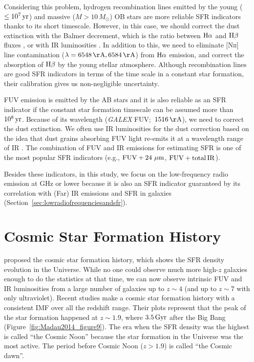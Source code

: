 Considering this problem, hydrogen recombination lines emitted by the young ($\leq 10^7\,\mathrm{yr}$) and massive ($M > 10\,M_{\odot}$) OB stars are more reliable SFR indicators thanks to its short timescale.
However, in this case, we should correct the dust extinction with the Balmer decrement, which is the ratio between $\mathrm{H\alpha}$ and $\mathrm{H\beta}$ fluxes \citep{Lequeux1981}, or with IR luminosities \citep{Kennicutt2009}.
In addition to this, we need to eliminate [N\textsc{ii}] line contamination ($\lambda = 6548\,\mr{\AA}, 6584\,\mr{\AA}$) from $\mathrm{H}\alpha$ emission, and correct the absorption of $\mathrm{H\beta}$ by the young stellar atmosphere.
Although recombination lines are good SFR indicators in terms of the time scale in a constant star formation, their calibration gives us non-negligible uncertainty.

FUV emission is emitted by the AB stars and it is also reliable as an SFR indicator if the constant star formation timescale can be assumed more than $10^8\,\mathrm{yr}$.
Because of its wavelength ({\it GALEX\/} FUV;~$1516\,\mr{\AA}$), we need to correct the dust extinction.
We often use IR luminosities for the dust correction based on the idea that dust grains absorbing FUV light re-emits it at a wavelength range of IR \citep{Kennicutt1998, Murphy2011}.
The combination of FUV and IR emissions for estimating SFR is one of the most popular SFR indicators (e.g., $\mathrm{FUV + 24\,\,\mathrm{\mu m}}$, $\mathrm{FUV + total\,IR}$).

Besides these indicators, in this study, we focus on the low-frequency radio emission at GHz or lower because it is also an SFR indicator guaranteed by its correlation with (Far) IR emissions and SFR in galaxies (Section~\ref{sec:lowradiofrequenciesandsfr}).





\section{Cosmic Star Formation History}\label{sec:cosmicstarformationhistory}

\citet{Tinsley1980} proposed the cosmic star formation history, which shows the SFR density evolution in the Universe.
While no one could observe much more high-$z$ galaxies enough to do the statistics at that time, we can now observe intrinsic FUV and IR luminosities from a large number of galaxies up to $z \sim 4$ (and up to $z \sim 7$ with only ultraviolet).
    Recent studies \citep{Hopkins2006, Madau2014} make a cosmic star formation history with a consistent IMF over all the redshift range.
Their plots represent that the peak of the star formation happened at $z\sim1.9$, where $3.5\,\mathrm{Gyr}$ after the Big Bang (Figure~\ref{fig:Madau2014_figure9}).
The era when the SFR density was the highest is called ``the Cosmic Noon'' because the star formation in the Universe was the most active.
The period before Cosmic Noon ($z > 1.9$) is called  ``the Cosmic dawn''.

